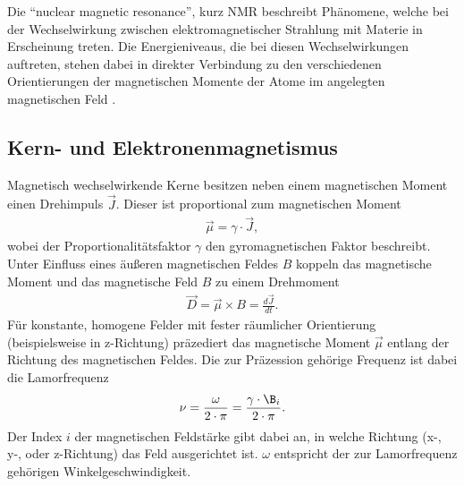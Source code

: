 \noindent Die \enquote{nuclear magnetic resonance}, kurz NMR beschreibt Phänomene, welche
bei der Wechselwirkung zwischen elektromagnetischer Strahlung mit Materie in
Erscheinung treten. Die Energieniveaus, die bei diesen Wechselwirkungen
auftreten, stehen dabei in direkter Verbindung zu den verschiedenen
Orientierungen der magnetischen Momente der Atome im angelegten magnetischen
Feld \cite{nmr_relaxation}.
\subsection{Kern- und Elektronenmagnetismus}
\noindent Magnetisch wechselwirkende Kerne besitzen neben einem magnetischen
Moment einen Drehimpuls $\vec{J}$. Dieser ist proportional zum magnetischen
Moment
\begin{align}
  \vec{\mu} = \gamma \cdot \vec{J},
  \label{eqn:01}
\end{align}
\noindent wobei der Proportionalitätsfaktor $\gamma$ den gyromagnetischen Faktor
beschreibt. Unter Einfluss eines äußeren magnetischen Feldes $B$ koppeln das
magnetische Moment und das magnetische Feld $B$ zu einem Drehmoment
\begin{align}
  \vec{D} = \vec{\mu} \times B = \frac{d \vec{J}}{dt}.
  \label{eqn:02}
\end{align}
\noindent Für konstante, homogene Felder mit fester räumlicher Orientierung
(beispielsweise in z-Richtung) präzediert das magnetische Moment $\vec{\mu}$
entlang der Richtung des magnetischen Feldes. Die zur Präzession gehörige
Frequenz ist dabei die Lamorfrequenz
\begin{align}
  \nu = \frac{\omega}{2 \cdot \pi} = \frac{\gamma \cdot \B_i}{2 \cdot \pi}.
  \label{eqn:03}
\end{align}
\noindent Der Index $i$ der magnetischen Feldstärke gibt dabei an, in welche
Richtung (x-, y-, oder z-Richtung) das Feld ausgerichtet ist. $\omega$ entspricht
der zur Lamorfrequenz gehörigen Winkelgeschwindigkeit.  
